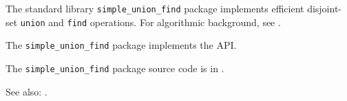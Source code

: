
The standard library {\tt simple\_union\_find} package implements efficient disjoint-set {\tt union} 
and {\tt find} operations.  For algorithmic background, see .

The {\tt simple\_union\_find} package implements the  API.

The {\tt simple\_union\_find} package source code is in .

See also:  .





